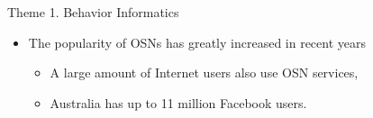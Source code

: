 \documentclass[
 size=14pt,
 paper=smartboard,  %
 mode=present, 		%
 display=slides, 	%
 style=tuliplab,  	%
 pauseslide,
 fleqn,leqno]{powerdot}
\begin{document}
\begin{slide}[toc=,bm=]{Theme 1. Behavior Informatics}

\begin{itemize}
\item
The popularity of OSNs has greatly increased in recent years

\begin{itemize}
\item
A large amount of Internet users also use OSN services,

\item
Australia has up to 11 million Facebook users.
\end{itemize}

\end{itemize}

\begin{figure}[htbp]
    \centering
\end{figure}

\end{slide}
\end{document}
